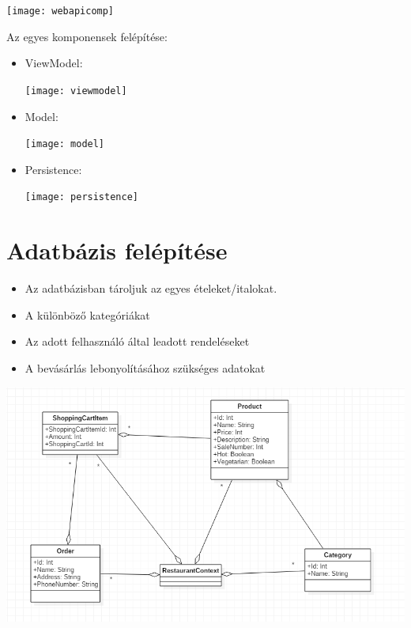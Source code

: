 \documentclass[12pt,a4paper]{article}
\begin{document}
\begin{center}
\texttt{[image: webapicomp]}
\end{center}

Az egyes komponensek felépítése:
\begin{itemize}
\item ViewModel:

\begin{center}
\texttt{[image: viewmodel]}
\end{center}

\item Model:

\begin{center}
\texttt{[image: model]}
\end{center}

\item Persistence:

\begin{center}
\texttt{[image: persistence]}
\end{center}

\end{itemize}

\section{Adatbázis felépítése}
\begin{itemize}
\item Az adatbázisban tároljuk az egyes ételeket/italokat.
\item A különböző kategóriákat
\item Az adott felhasználó által leadott rendeléseket
\item A bevásárlás lebonyolításához szükséges adatokat
\end{itemize}
\includegraphics[scale=0.5]{database}
\end{document}
